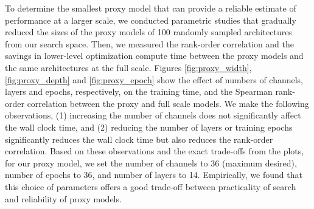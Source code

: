 \documentclass[journal]{IEEEtran}
\theoremstyle{definition}
\theoremstyle{remark}
\begin{document}
To determine the smallest proxy model that can provide a reliable estimate of performance at a larger scale, we conducted parametric studies that gradually reduced the sizes of the proxy models of 100 randomly sampled architectures from our search space. Then, we measured the rank-order correlation and the savings in lower-level optimization compute time between the proxy models and the same architectures at the full scale. Figures \ref{fig:proxy_width}, \ref{fig:proxy_depth} and \ref{fig:proxy_epoch} show the effect of numbers of channels, layers and epochs, respectively, on the training time, and the Spearman rank-order correlation between the proxy and full scale models. We make the following observations, (1) increasing the number of channels does not significantly affect the wall clock time, and (2) reducing the number of layers or training epochs significantly reduces the wall clock time but also reduces the rank-order correlation. Based on these observations and the exact trade-offs from the plots, for our proxy model, we set the number of channels to 36 (maximum desired), number of epochs to 36, and number of layers to 14. Empirically, we found that this choice of parameters offers a good trade-off between practicality of search and reliability of proxy models.
\end{document}
